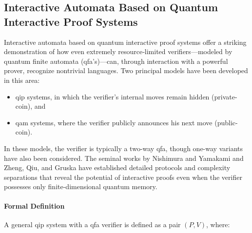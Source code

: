 \subsection{Interactive Automata Based on Quantum Interactive Proof Systems}
\label{sec:interactive-automata}

Interactive automata based on quantum interactive proof systems offer a striking demonstration of how even extremely resource‐limited verifiers—modeled by quantum finite automata (qfa's)—can, through interaction with a powerful prover, recognize nontrivial languages. Two principal models have been developed in this area:
  
\begin{itemize}
  \item \gls{qip} systems, in which the verifier's internal moves remain hidden (private-coin), and
  \item \gls{qam} systems, where the verifier publicly announces his next move (public-coin).
\end{itemize}

In these models, the verifier is typically a two-way qfa, though one-way variants have also been considered. The seminal works by Nishimura and Yamakami \cite{nishimura2009application, nishimura2015interactive} and Zheng, Qiu, and Gruska \cite{zheng2015power} have established detailed protocols and complexity separations that reveal the potential of interactive proofs even when the verifier possesses only finite-dimensional quantum memory.

\paragraph{Formal Definition}
A general \gls{qip} system with a qfa verifier is defined as a pair $(P,V)$, where:


